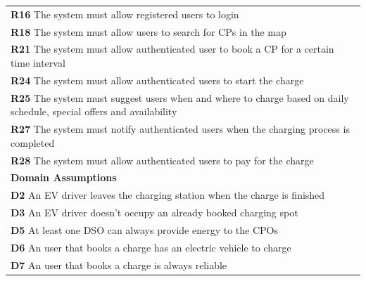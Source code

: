 \begin{table}[H]
\begin{tabularx}{\textwidth}{X}
        \textbf{R16} The system must allow registered users to login                                                                  \\
        \textbf{R18} The system must allow users to search for CPs in the map                                                         \\
        \textbf{R21} The system must allow authenticated user to book a CP for a certain time interval                                \\
        \textbf{R24} The system must allow authenticated users to start the charge                                                    \\
        \textbf{R25} The system must suggest users when and where to charge based on daily schedule, special offers and availability  \\
        \textbf{R27} The system must notify authenticated users when the charging process is completed                                \\
        \textbf{R28} The system must allow authenticated users to pay for the charge                                                  \\ \midrule
        \textbf{Domain Assumptions}                                                                                                   \\ \midrule
        \textbf{D2} An EV driver leaves the charging station when the charge is finished                                              \\
        \textbf{D3} An EV driver doesn't occupy an already booked charging spot                                                       \\
        \textbf{D5} At least one DSO can always provide energy to the CPOs                                                            \\
        \textbf{D6} An user that books a charge has an electric vehicle to charge                                                     \\
        \textbf{D7} An user that books a charge is always reliable                                                                    \\    \bottomrule
    \end{tabularx}
\end{table}
